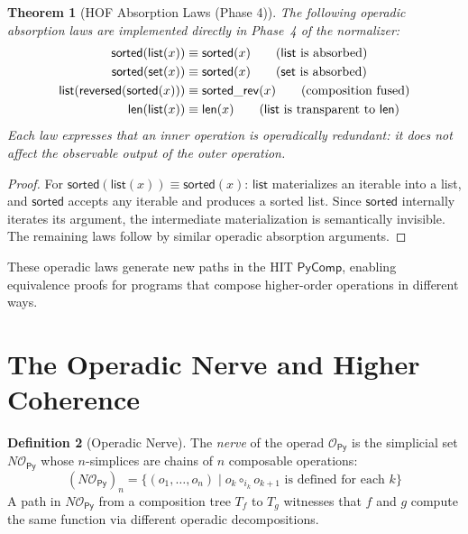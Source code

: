 \documentclass[11pt,a4paper]{report}
\theoremstyle{definition}
\newtheorem{definition}{Definition}[chapter]
\theoremstyle{plain}
\newtheorem{theorem}[definition]{Theorem}
\begin{document}
\begin{theorem}[HOF Absorption Laws (Phase 4)]
\label{thm:hof-absorption}
The following operadic absorption laws are implemented directly
in Phase~4 of the normalizer:
\begin{align}
  \mathsf{sorted}(\mathsf{list}(x)) &\equiv \mathsf{sorted}(x)
    \tag{$\mathsf{list}$ is absorbed} \\
  \mathsf{sorted}(\mathsf{set}(x)) &\equiv \mathsf{sorted}(x)
    \tag{$\mathsf{set}$ is absorbed} \\
  \mathsf{list}(\mathsf{reversed}(\mathsf{sorted}(x))) &\equiv
    \mathsf{sorted\_rev}(x) \tag{composition fused} \\
  \mathsf{len}(\mathsf{list}(x)) &\equiv \mathsf{len}(x)
    \tag{$\mathsf{list}$ is transparent to $\mathsf{len}$}
\end{align}
Each law expresses that an inner operation is \emph{operadically
redundant}: it does not affect the observable output of the outer
operation.
\end{theorem}

\begin{proof}
For $\mathsf{sorted}(\mathsf{list}(x)) \equiv \mathsf{sorted}(x)$:
$\mathsf{list}$ materializes an iterable into a list, and
$\mathsf{sorted}$ accepts any iterable and produces a sorted list.
Since $\mathsf{sorted}$ internally iterates its argument,
the intermediate materialization is semantically invisible.
The remaining laws follow by similar operadic absorption arguments.
\end{proof}

These operadic laws generate new paths in the HIT $\mathsf{PyComp}$,
enabling equivalence proofs for programs that compose higher-order
operations in different ways.

\section{The Operadic Nerve and Higher Coherence}

\begin{definition}[Operadic Nerve]
\label{def:operadic-nerve}
The \emph{nerve} of the operad $\mathcal{O}_\mathsf{Py}$ is the
simplicial set $N\mathcal{O}_\mathsf{Py}$ whose $n$-simplices are
chains of $n$ composable operations:
\[
  (N\mathcal{O}_\mathsf{Py})_n = \{(o_1, \ldots, o_n) \mid
  o_k \circ_{i_k} o_{k+1} \text{ is defined for each } k\}
\]
A path in $N\mathcal{O}_\mathsf{Py}$ from a composition tree $T_f$ to
$T_g$ witnesses that $f$ and $g$ compute the same function via
different operadic decompositions.
\end{definition}
\end{document}
